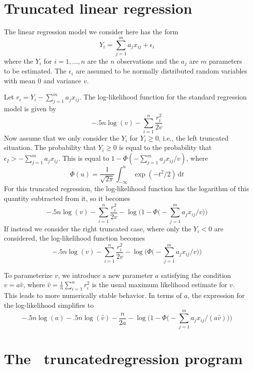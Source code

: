 %
%

\section{Truncated linear regression}

The linear regression model we consider here has the form
$$Y_i=\sum_{j=1}^m a_j x_{ij} +\epsilon_i$$
where the $Y_i$ for $i=1,\ldots,n$ are the $n$ observations
and the $a_j$ are $m$ parameters to be estimated.  
The $\epsilon_i$ are assumed to be normally distributed random 
variables with mean $0$ and variance $v$.

Let $r_i=Y_i-\sum_{j=1}^m a_j x_{ij}$. The log-likelihood function 
for the standard regression model is given by
$$ -.5n\log(v) - \sum_{i=1}^n  \frac{r_i^2 }{ 2v}$$
Now assume that we only consider the $Y_i$ for $Y_i \ge 0$,
i.e., the left truncated situation.
The probability that $Y_i\ge 0$ is equal to the probability that
$\epsilon_I>-\sum_{j=1}^m a_j x_{ij} $. This is equal to 
$1-\Phi(-\sum_{j=1}^m a_j x_{ij} /v)$, where
$$\Phi(u)=\frac{1}{\sqrt{2\pi}}\int_{-\infty}^u \exp \left(-t^2/2 \right)\,\textrm{d}t$$
For this truncated regression, the log-likelihood function
has the logarithm of this quantity subtracted from it,
so it becomes 
$$ -.5n\log(v) - \sum_{i=1}^n  \frac{r_i^2 }{ 2v}
   -\log\Bigg(1-\Phi \bigg(-\sum_{j=1}^m a_j x_{ij} /v \bigg)\Bigg)$$
If instead we consider the right truncated case, where only the $Y_i<0$
are considered, the log-likelihood function becomes
$$ -.5n\log(v) - \sum_{i=1}^n    \frac{r_i^2 }{ 2v}
   -\log\Bigg(\Phi \bigg(-\sum_{j=1}^m a_j x_{ij} /v \bigg)\Bigg)$$
 
To parameterize $v$, we introduce a new parameter $a$ satisfying
the condition $v=a\hat v$, where 
$\hat v=\frac{1}{ n}\sum_{i=1}^n  r_i^2$ is the usual maximum likelihood
estimate for $v$. This leads to more
numerically stable behavior. In terms of $a$, the 
expression for the log-likelihood simplifies to
$$ -.5n\log(a)-.5n\log(\hat v) - \frac{n}{ 2a}
   -\log\Bigg(1-\Phi \bigg(-\sum_{j=1}^m a_j x_{ij}/(a \hat v)\bigg)\Bigg)$$
   
   
\section{The \ADM\ truncated\br regression program}

